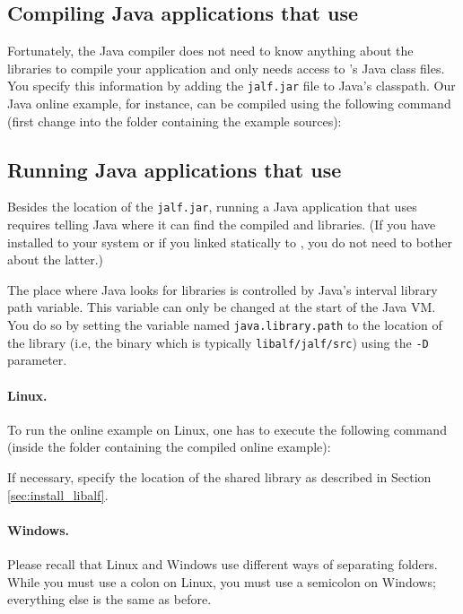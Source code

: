 \subsection{Compiling Java applications that use \jalf}
Fortunately, the Java compiler does not need to know anything about the \cpp libraries to compile your application and only needs access to \jalf's Java class files. You specify this information by adding the \texttt{jalf.jar} file to Java's classpath. Our Java online example, for instance, can be compiled using the following command (first change into the folder containing the example sources):


\subsection{Running Java applications that use \jalf}
Besides the location of the \texttt{jalf.jar}, running a Java application that uses \jalf requires telling Java where it can find the compiled \jalf and \libalf \cpp libraries. (If you have installed \libalf to your system or if you linked \jalf statically to \jalf, you do not need to bother about the latter.)

The place where Java looks for \cpp libraries is controlled by Java's interval library path variable. This variable can only be changed at the start of the Java VM. You do so by setting the variable named \texttt{java.library.path} to the location of the \jalf library (i.e, the \jalf \cpp binary which is typically \texttt{libalf/jalf/src}) using the \texttt{-D} parameter. 

\paragraph{Linux.}
To run the online example on Linux, one has to execute the following command (inside the folder containing the compiled online example):


If necessary, specify the location of the shared \libalf library as described in Section \ref{sec:install_libalf}.

\paragraph{Windows.}
Please recall that Linux and Windows use different ways of separating folders. While you must use a colon on Linux, you must use a semicolon on Windows; everything else is the same as before.

